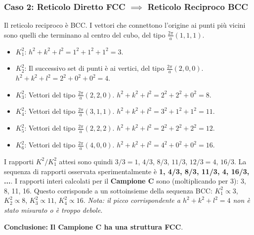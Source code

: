 \subsubsection{Caso 2: Reticolo Diretto FCC $\implies$ Reticolo Reciproco BCC}
Il reticolo reciproco è BCC. I vettori che connettono l'origine ai punti più vicini sono quelli che terminano al centro del cubo, del tipo $\frac{2\pi}{a}(1,1,1)$.
\begin{itemize}
    \item $K_1^2$: $h^2+k^2+l^2 = 1^2+1^2+1^2 = 3$.
    \item $K_2^2$: Il successivo set di punti è ai vertici, del tipo $\frac{2\pi}{a}(2,0,0)$. $h^2+k^2+l^2 = 2^2+0^2+0^2 = 4$.
    \item $K_3^2$: Vettori del tipo $\frac{2\pi}{a}(2,2,0)$. $h^2+k^2+l^2 = 2^2+2^2+0^2 = 8$.
    \item $K_4^2$: Vettori del tipo $\frac{2\pi}{a}(3,1,1)$. $h^2+k^2+l^2 = 3^2+1^2+1^2 = 11$.
    \item $K_5^2$: Vettori del tipo $\frac{2\pi}{a}(2,2,2)$. $h^2+k^2+l^2 = 2^2+2^2+2^2 = 12$.
    \item $K_6^2$: Vettori del tipo $\frac{2\pi}{a}(4,0,0)$. $h^2+k^2+l^2 = 4^2+0^2+0^2 = 16$.
\end{itemize}
I rapporti $K^2/K_1^2$ attesi sono quindi $3/3=1$, $4/3$, $8/3$, $11/3$, $12/3=4$, $16/3$.
La sequenza di rapporti osservata sperimentalmente è \textbf{1, 4/3, 8/3, 11/3, 4, 16/3, ...}.
I rapporti interi calcolati per il \textbf{Campione C} sono (moltiplicando per 3): 3, 8, 11, 16. Questo corrisponde a un sottoinsieme della sequenza BCC: $K_1^2 \propto 3$, $K_2^2 \propto 8$, $K_3^2 \propto 11$, $K_4^2 \propto 16$.
\textit{Nota: il picco corrispondente a $h^2+k^2+l^2 = 4$ non è stato misurato o è troppo debole}.

\textbf{Conclusione:} \textbf{Il Campione C ha una struttura FCC}.

